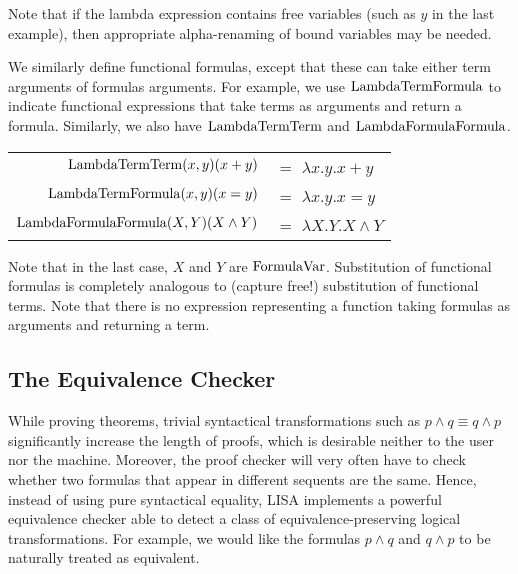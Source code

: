 Note that if the lambda expression contains free variables (such as $y$ in the last example), then appropriate alpha-renaming of bound variables may be needed.

We similarly define functional formulas, except that these can take either term arguments of formulas arguments. For example, we use $\operatorname{LambdaTermFormula}$ to indicate functional expressions that take terms as arguments and return a formula. Similarly, we also have $\operatorname{LambdaTermTerm}$ and $\operatorname{LambdaFormulaFormula}$.

\begin{ex}
  \begin{center}
    \begin{tabular}{|r l|}
      \hline
      \rule{0em}{1.3em}
      $\operatorname{LambdaTermTerm}(x, y)(x+y)$       & $=$ $\lambda x.y. x+y$       \\
      $\operatorname{LambdaTermFormula}(x, y)(x=y)$       & $=$ $\lambda x.y. x=y$       \\
      $\operatorname{LambdaFormulaFormula}(X, Y)(X \land Y)$ & $=$ $\lambda X.Y. X \land Y$
      \rule[-1em]{0em}{0em}                                       \\
      \hline
    \end{tabular}
  \end{center}

\end{ex}

Note that in the last case, $X$ and $Y$ are $\operatorname{FormulaVar}$. Substitution of functional formulas is completely analogous to (capture free!) substitution of functional terms. Note that there is no expression representing a function taking formulas as arguments and returning a term.

\subsection{The Equivalence Checker}
\label{subsec:equivalencechecker}

While proving theorems, trivial syntactical transformations such as $p\land q \equiv q\land p$ significantly increase the length of proofs, which is desirable neither to the user nor the machine. Moreover, the proof checker will very often have to check whether two formulas that appear in different sequents are the same. Hence, instead of using pure syntactical equality, LISA implements a powerful equivalence checker able to detect a class of equivalence-preserving logical transformations. For example, we would like the  formulas $p\land q$ and $q\land p$ to be naturally treated as equivalent.

